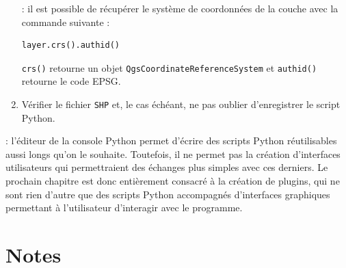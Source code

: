 \documentclass[11pt]{article}
\begin{document}
\begin{enumerate}
\newpage{}
\underline{}: il est possible de récupérer le système de coordonnées de la couche avec la commande suivante : 
\vspace*{-2em}
\begin{center}
\begin{minipage}[t]{0.24\textwidth}
\begin{verbatim}
layer.crs().authid()
\end{verbatim}
\end{minipage}
\end{center}
\vspace*{1em}

\texttt{crs()} retourne un objet \texttt{QgsCoordinateReferenceSystem} et \texttt{authid()} retourne le code EPSG.\\


\item Vérifier le fichier \texttt{SHP} et, le cas échéant, ne pas oublier d'enregistrer le script Python.



\end{enumerate}
\vspace*{1em}


\underline{}:  l'éditeur de la console Python permet d'écrire des scripts Python réutilisables aussi longs qu'on le souhaite. Toutefois, il ne permet pas la création d'interfaces utilisateurs qui permettraient des échanges plus simples avec ces derniers. Le prochain chapitre est donc entièrement consacré à la création de plugins, qui ne sont rien d'autre que des scripts Python accompagnés d'interfaces graphiques permettant à l'utilisateur d'interagir avec le programme. 


\section*{Notes}
\hrulefill
\vspace*{1.6em}

\hrulefill
\vspace*{1.6em}

\hrulefill
\vspace*{1.6em}

\hrulefill
\vspace*{1.6em}

\hrulefill
\vspace*{1.6em}
\end{document}
